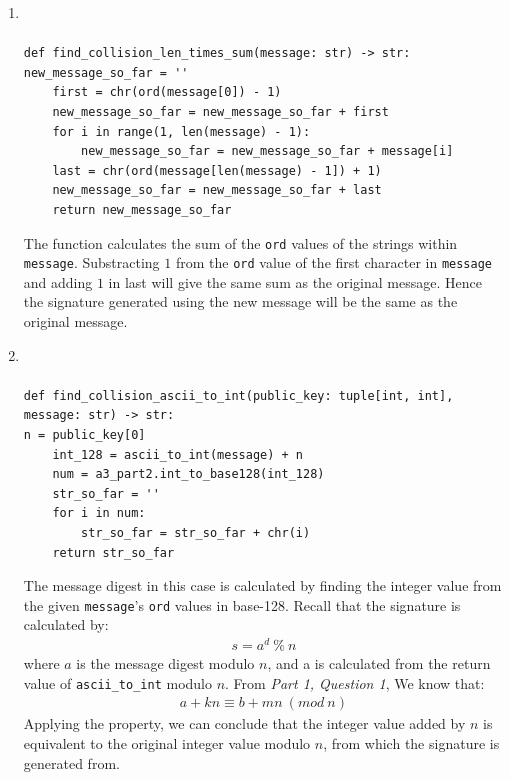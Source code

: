 \documentclass[11pt]{article}
\begin{document}
\begin{enumerate}

\item[3b.]

\begin{verbatim}


def find_collision_len_times_sum(message: str) -> str:
new_message_so_far = ''
    first = chr(ord(message[0]) - 1)
    new_message_so_far = new_message_so_far + first
    for i in range(1, len(message) - 1):
        new_message_so_far = new_message_so_far + message[i]
    last = chr(ord(message[len(message) - 1]) + 1)
    new_message_so_far = new_message_so_far + last
    return new_message_so_far

\end{verbatim}


The function calculates the sum of the \texttt{ord} values of the strings within \texttt{message}. Substracting $1$ from the \texttt{ord} value of the first character in \texttt{message} and adding $1$ in last will give the same sum as the original message. Hence the signature generated using the new message will be the same as the original message.

\newpage

\item[4b.]

\begin{verbatim}


def find_collision_ascii_to_int(public_key: tuple[int, int], message: str) -> str:
n = public_key[0]
    int_128 = ascii_to_int(message) + n
    num = a3_part2.int_to_base128(int_128)
    str_so_far = ''
    for i in num:
        str_so_far = str_so_far + chr(i)
    return str_so_far
\end{verbatim}

The message digest in this case is calculated by finding the integer value from the given \texttt{message}'s \texttt{ord} values in base-128. Recall that the signature is calculated by:
\begin{align*}
s = a^d  \ \% \ n
\end{align*}
where $a$ is the message digest modulo $n$, and a is calculated from the return value of \texttt{ascii\_to\_int} modulo $n$. From \textit{Part 1, Question 1}, We know that:
\begin{align*}
a + kn \equiv b + mn \ (mod\ n)
\end{align*}
Applying the property, we can conclude that the integer value added by $n$ is equivalent to the original integer value modulo $n$, from which the signature is generated from.
\end{enumerate}
\end{document}
